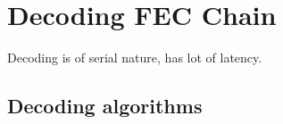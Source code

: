 \chapter{Decoding FEC Chain} \label{chap:decoder}


Decoding is of serial nature, has lot of latency.

\section{Decoding algorithms}